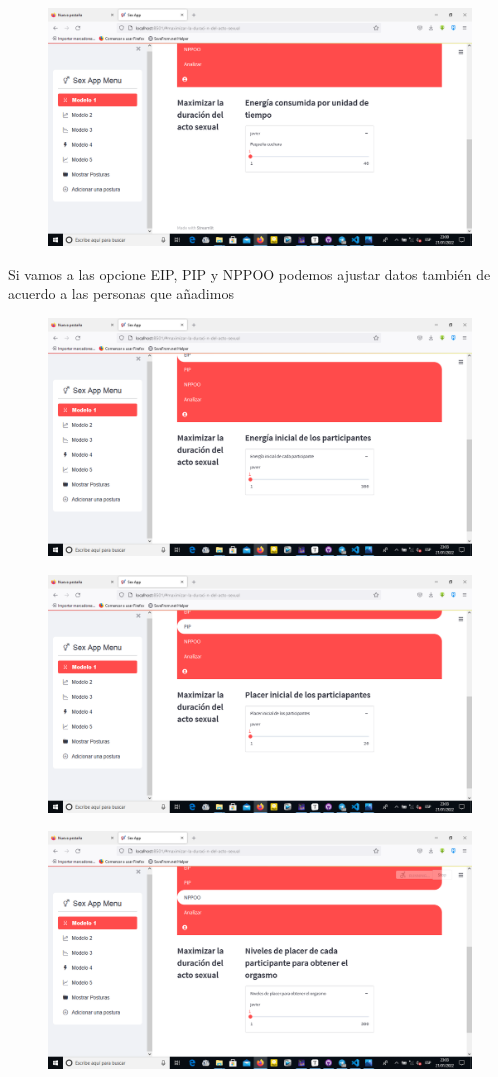 \documentclass{llncs}
\begin{document}
\begin{figure}
	\centering
	\includegraphics[width=0.7\linewidth]{Imagenes/aplicacion/web11}
	\label{fig:web11}
\end{figure}

Si vamos a las opcione EIP, PIP y NPPOO podemos ajustar datos también de acuerdo a las personas que añadimos

\begin{figure}
	\centering
	\includegraphics[width=0.7\linewidth]{Imagenes/aplicacion/web12}
	\label{fig:web12}
\end{figure}
\begin{figure}
	\centering
	\includegraphics[width=0.7\linewidth]{Imagenes/aplicacion/web13}
	\label{fig:web13}
\end{figure}
\begin{figure}
	\centering
	\includegraphics[width=0.7\linewidth]{Imagenes/aplicacion/web14}
	\label{fig:web14}
\end{figure}
\end{document}
